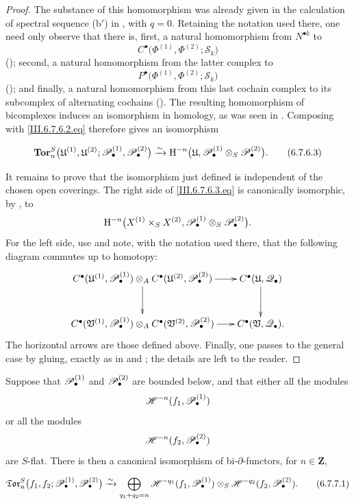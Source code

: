 \begin{proof}
The substance of this homomorphism was already given in the
calculation of spectral sequence \textnormal{(b$'$)} in
, with $q=0$.  Retaining the notation used
there, one need only observe that there is, first, a natural
homomorphism from $N^{\bullet k}$ to
\[
  C^\bullet
  \bigl(
    \Phi^{(1)},\Phi^{(2)};\mathcal S_k
  \bigr)
\]
(); second, a natural homomorphism from the
latter complex to
\[
  P^\bullet
  \bigl(
    \Phi^{(1)},\Phi^{(2)};\mathcal S_k
  \bigr)
\]
(); and finally, a natural homomorphism from
this last cochain complex to its subcomplex of alternating
cochains ().  The resulting homomorphism of
bicomplexes induces an isomorphism in homology, as was seen in
.  Composing with
\eqref{III.6.7.6.2.eq} therefore gives an isomorphism
\begin{env}[6.7.6.3]
\label{III.6.7.6.3}
\[
  \mathbf{Tor}_n^S
  \bigl(
    \mathfrak U^{(1)},\mathfrak U^{(2)};
    \mathscr{P}_\bullet^{(1)},\mathscr{P}_\bullet^{(2)}
  \bigr)
  \xrightarrow{\sim}
  \mathrm H^{-n}
  \bigl(
    \mathfrak U,
    \mathscr{P}_\bullet^{(1)}
    \otimes_S\mathscr{P}_\bullet^{(2)}
  \bigr).
  \tag{6.7.6.3}\label{III.6.7.6.3.eq}
\]
\end{env}

It remains to prove that the isomorphism just defined is
independent of the chosen open coverings.  The right side of
\eqref{III.6.7.6.3.eq} is canonically isomorphic, by
, to
\[
  \mathrm H^{-n}
  \bigl(
    X^{(1)}\times_SX^{(2)},
    \mathscr{P}_\bullet^{(1)}
    \otimes_S\mathscr{P}_\bullet^{(2)}
  \bigr).
\]
For the left side, use  and note, with the
notation used there, that the following diagram commutes up to
homotopy:
\[
\xymatrix@C=18pt@R=28pt{
  C^\bullet(\mathfrak U^{(1)},\sh P_\bullet^{(1)})
  \otimes_A
  C^\bullet(\mathfrak U^{(2)},\sh P_\bullet^{(2)})
  \ar[r]\ar[d]
  &
  C^\bullet(\mathfrak U,\sh Q_\bullet)
  \ar[d]
  \\
  C^\bullet(\mathfrak V^{(1)},\sh P_\bullet^{(1)})
  \otimes_A
  C^\bullet(\mathfrak V^{(2)},\sh P_\bullet^{(2)})
  \ar[r]
  &
  C^\bullet(\mathfrak V,\sh Q_\bullet).
}
\]
The horizontal arrows are those defined above.  Finally, one
passes to the general case by gluing, exactly as in
 and ; the details are left to
the reader.
\end{proof}

\begin{proposition}[6.7.7]
\label{III.6.7.7}
Suppose that $\mathscr{P}_\bullet^{(1)}$ and
$\mathscr{P}_\bullet^{(2)}$ are bounded below, and that either all the
modules
\[
  \mathscr{H}^{-n}(f_1,\mathscr{P}_\bullet^{(1)})
\]
or all the modules
\[
  \mathscr{H}^{-n}(f_2,\mathscr{P}_\bullet^{(2)})
\]
are $S$-flat.  There is then a canonical isomorphism of
bi-$\partial$-functors, for $n\in\mathbf Z$,
\begin{env}[6.7.7.1]
\label{III.6.7.7.1}
\[
  \mathfrak{Tor}_n^S
  \bigl(
    f_1,f_2;
    \mathscr{P}_\bullet^{(1)},\mathscr{P}_\bullet^{(2)}
  \bigr)
  \xrightarrow{\sim}
  \bigoplus_{q_1+q_2=n}
  \mathscr{H}^{-q_1}(f_1,\mathscr{P}_\bullet^{(1)})
  \otimes_S
  \mathscr{H}^{-q_2}(f_2,\mathscr{P}_\bullet^{(2)}).
  \tag{6.7.7.1}\label{III.6.7.7.1.eq}
\]
\end{env}
\end{proposition}

